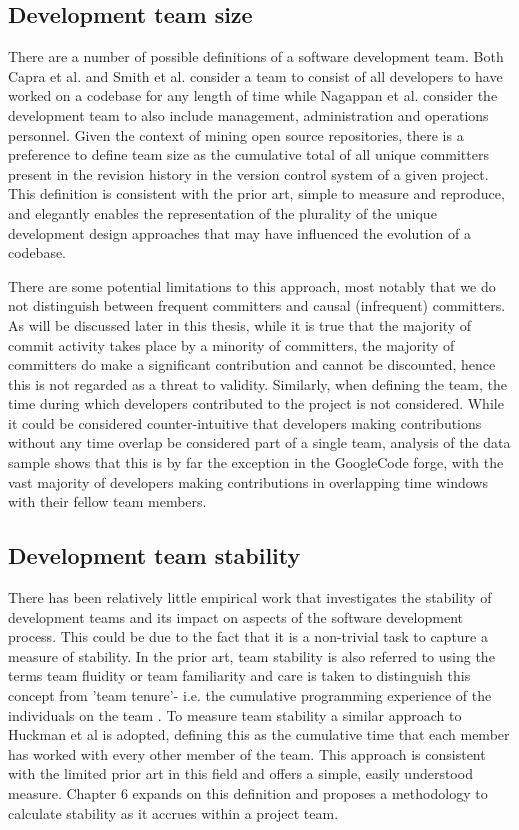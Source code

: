 \subsection{Development team size}
There are a number of possible definitions of a software development team. Both Capra et al. and Smith et al. consider a team to consist of all developers to have worked on a codebase for any length of time \cite{capra2008framework}\cite{smith2001empirical} while Nagappan et al. \cite{nagappan2008influence} consider the development team to also include management, administration and operations personnel. Given the context of mining open source repositories, there is a preference to define team size as the cumulative total of all unique committers present in the revision history in the version control system of a given project. This definition is consistent with the prior art, simple to measure and reproduce, and elegantly enables the representation of the plurality of the unique development design approaches that may have influenced the evolution of a codebase. 

There are some potential limitations to this approach, most notably that we do not distinguish between frequent committers and causal (infrequent) committers. As will be discussed later in this thesis, while it is true that the majority of commit activity takes place by a minority of committers, the majority of committers do make a significant contribution and cannot be discounted, hence this is not regarded as a threat to validity. Similarly, when defining the team, the time during which developers contributed to the project is not considered. While it could be considered counter-intuitive that developers making contributions without any time overlap be considered part of a single team, analysis of the data sample shows that this is by far the exception in the GoogleCode forge, with the vast majority of developers making contributions in overlapping time windows with their fellow team members.

\subsection{Development team stability}
There has been relatively little empirical work that investigates the stability of development teams and its impact on aspects of the software development process. This could be due to the fact that it is a non-trivial task to capture a measure of stability. In the prior art, team stability is also referred to using the terms team fluidity or team familiarity \cite{huckman2009team} and care is taken to distinguish this concept from 'team tenure'- i.e. the cumulative programming experience of the individuals on the team \cite{hackman2002leading}. To measure team stability a similar approach to Huckman et al \cite{huckman2009team} is adopted, defining this as the cumulative time that each member has worked with every other member of the team. This approach is consistent with the limited prior art in this field and offers a simple, easily understood measure. Chapter 6 expands on this definition and proposes a methodology to calculate stability as it accrues within a project team.
	
